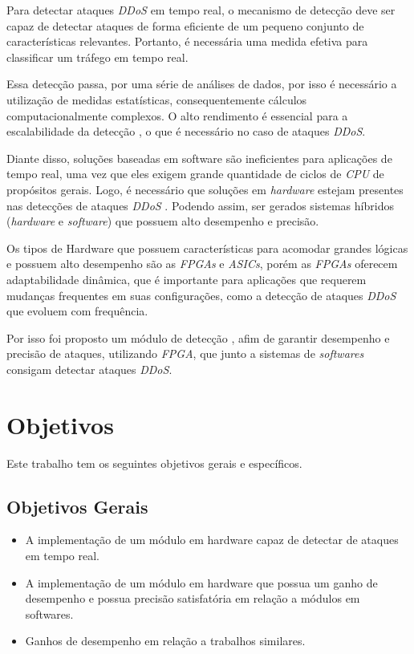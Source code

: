 Para detectar ataques  \textit{DDoS} em tempo real, o mecanismo de detecção deve ser capaz de detectar ataques de forma eficiente de um pequeno conjunto de características relevantes.
Portanto, é necessária uma medida efetiva  para classificar um  tráfego em tempo real. 

Essa detecção passa, por uma série de análises de dados, por isso é necessário a utilização de medidas estatísticas, consequentemente cálculos computacionalmente complexos. O alto rendimento é essencial para a escalabilidade da detecção , o que é necessário no caso de ataques \textit{DDoS}.

Diante disso, soluções baseadas em software são ineficientes para aplicações de tempo real, uma vez que eles exigem grande quantidade de ciclos de  \textit{CPU} de propósitos gerais. Logo, é necessário que soluções em \textit{hardware} estejam presentes nas detecções de ataques \textit{DDoS} . Podendo assim, ser gerados sistemas híbridos (\textit{hardware} e \textit{software}) que possuem alto desempenho e precisão.

Os tipos de Hardware que possuem características para acomodar grandes lógicas e possuem alto desempenho são as \textit{FPGAs} e \textit{ASICs}, porém as \textit{FPGAs} oferecem adaptabilidade dinâmica, que é importante para aplicações que requerem mudanças frequentes em suas configurações, como a detecção de ataques \textit{DDoS} que evoluem com frequência. 

Por isso foi proposto um módulo de detecção , afim de garantir desempenho e precisão de ataques, utilizando \textit{FPGA}, que junto a sistemas de  \textit{softwares} consigam detectar ataques  \textit{DDoS}.

\section{Objetivos}

   Este trabalho tem os seguintes objetivos gerais e específicos.
\subsection{Objetivos Gerais}
\begin{itemize}

\item  A implementação de um módulo em hardware capaz de detectar de ataques em tempo real.

\item  A implementação de um módulo em hardware que possua um ganho de desempenho e possua precisão satisfatória em relação a módulos em softwares.

\item Ganhos de desempenho em relação a trabalhos similares.	

\end{itemize}

